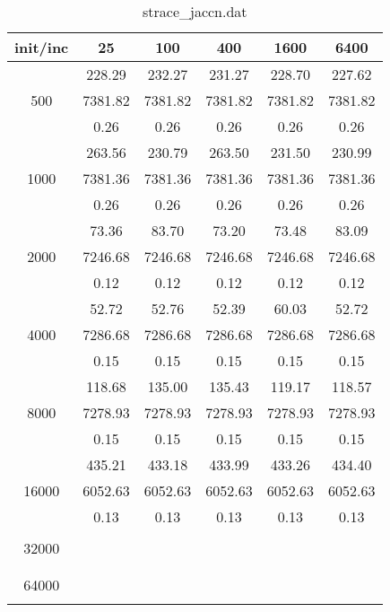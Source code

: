 \begin{table}[th]
\caption{strace\_jaccn.dat}
\label{tab:strace_jaccn.dat}
\centering
\begin{tabular}{|c||c|c|c|c|c|}
\hline
init/inc & 25 & 100 & 400 & 1600 & 6400 \\ \hline \hline
  & 228.29 & 232.27 & 231.27 & 228.70 & 227.62\\ 
500  & 7381.82 & 7381.82 & 7381.82 & 7381.82 & 7381.82\\ 
  & 0.26 & 0.26 & 0.26 & 0.26 & 0.26\\ \hline 
  & 263.56 & 230.79 & 263.50 & 231.50 & 230.99\\ 
1000  & 7381.36 & 7381.36 & 7381.36 & 7381.36 & 7381.36\\ 
  & 0.26 & 0.26 & 0.26 & 0.26 & 0.26\\ \hline 
  & 73.36 & 83.70 & 73.20 & 73.48 & 83.09\\ 
2000  & 7246.68 & 7246.68 & 7246.68 & 7246.68 & 7246.68\\ 
  & 0.12 & 0.12 & 0.12 & 0.12 & 0.12\\ \hline 
  & 52.72 & 52.76 & 52.39 & 60.03 & 52.72\\ 
4000  & 7286.68 & 7286.68 & 7286.68 & 7286.68 & 7286.68\\ 
  & 0.15 & 0.15 & 0.15 & 0.15 & 0.15\\ \hline 
  & 118.68 & 135.00 & 135.43 & 119.17 & 118.57\\ 
8000  & 7278.93 & 7278.93 & 7278.93 & 7278.93 & 7278.93\\ 
  & 0.15 & 0.15 & 0.15 & 0.15 & 0.15\\ \hline 
  & 435.21 & 433.18 & 433.99 & 433.26 & 434.40\\ 
16000  & 6052.63 & 6052.63 & 6052.63 & 6052.63 & 6052.63\\ 
  & 0.13 & 0.13 & 0.13 & 0.13 & 0.13\\ \hline 
  &  &  &  &  & \\ 
32000  &  &  &  &  & \\ 
  &  &  &  &  & \\ \hline 
  &  &  &  &  & \\ 
64000  &  &  &  &  & \\ 
  &  &  &  &  & \\ \hline 
\end{tabular}
\end{table}

